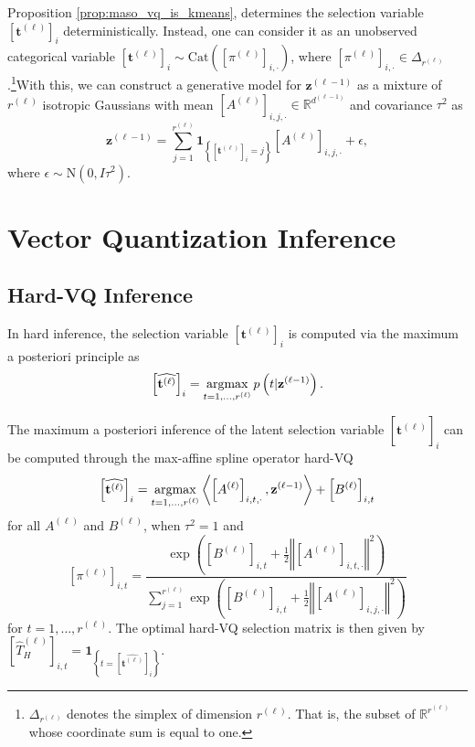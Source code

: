Proposition \ref{prop:maso_vq_is_kmeans}, determines the selection variable $\left[\mathbf{t}^{(\ell)}\right]_i$ deterministically. Instead, one can consider it as an unobserved categorical variable $\left[\mathbf{t}^{(\ell)}\right]_i\sim\text{Cat}\left(\left[\pi^{(\ell)}\right]_{i,\cdot}\right)$, where $\left[\pi^{(\ell)}\right]_{i,\cdot}\in\Delta_{r^{(\ell)}}$.\footnote{$\Delta_{r^{(\ell)}}$ denotes the simplex of dimension $r^{(\ell)}$. That is, the subset of $\mathbb{R}^{r^{(\ell)}}$ whose coordinate sum is equal to one.}With this, we can construct a generative model for $\mathbf{z}^{(\ell-1)}$ as a mixture of $r^{(\ell)}$ isotropic Gaussians with mean $\left[A^{(\ell)}\right]_{i,j,\cdot}\in\mathbb{R}^{d^{(\ell-1)}}$ and covariance $\tau^2$ as
\begin{equation}\label{eq:smaso_gmm}
    \mathbf{z}^{(\ell-1)}=\sum_{j=1}^{r^{(\ell)}}\mathbf{1}_{\left\{\left[\mathbf{t}^{(\ell)}\right]_i=j\right\}}\left[A^{(\ell)}\right]_{i,j,\cdot}+\epsilon,
\end{equation}
where $\epsilon\sim\text{N}\left(0,I\tau^2\right)$.

\section{Vector Quantization Inference}\label{sec:vq_inference}

\subsection{Hard-VQ Inference}

In hard inference, the selection variable $\left[\mathbf{t}^{(\ell)}\right]_i$ is computed via the maximum a posteriori principle as $$\left[\widehat{\mathbf{t}^{(\ell)}}\right]_i=\operatorname*{\mathrm{argmax}}_{t=1,\dots,r^{(\ell)}}p\left(t\vert\mathbf{z}^{(\ell-1)}\right).$$

\begin{theorem}
    The maximum a posteriori inference of the latent selection variable $\left[\widehat{\mathbf{t}^{(\ell)}}\right]_i$ can be computed through the max-affine spline operator hard-VQ $$\left[\widehat{\mathbf{t}^{(\ell)}}\right]_i=\operatorname*{\mathrm{argmax}}_{t=1,\dots,r^{(\ell)}}\left\langle\left[A^{(\ell)}\right]_{i,t,\cdot},\mathbf{z}^{(\ell-1)}\right\rangle+\left[B^{(\ell)}\right]_{i,t}$$for all $A^{(\ell)}$ and $B^{(\ell)}$, when $\tau^2=1$ and $$\left[\pi^{(\ell)}\right]_{i,t}=\frac{\exp\left(\left[B^{(\ell)}\right]_{i,t}+\frac{1}{2}\left\Vert\left[A^{(\ell)}\right]_{i,t,\cdot}\right\Vert^2\right)}{\sum_{j=1}^{r^{(\ell)}}\exp\left(\left[B^{(\ell)}\right]_{i,t}+\frac{1}{2}\left\Vert\left[A^{(\ell)}\right]_{i,j,\cdot}\right\Vert^2\right)}$$for $t=1,\dots,r^{(\ell)}$. The optimal hard-VQ selection matrix is then given by $\left[\widehat{T}_H^{(\ell)}\right]_{i,t}=\mathbf{1}_{\left\{t=\left[\widehat{\mathbf{t}^{(\ell)}}\right]_i\right\}}$.
\end{theorem}

